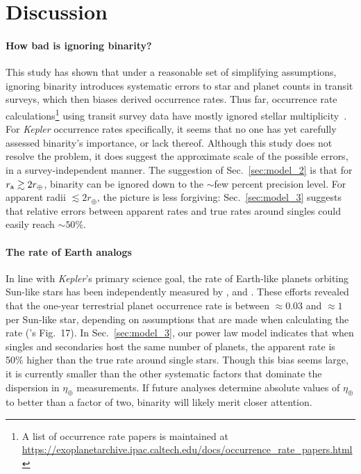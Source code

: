 \documentclass[12pt,modern]{aastex61}
\renewcommand{\a}{_{\rm a}}
\begin{document}
\section{Discussion}
\label{sec:discussion}


\paragraph{How bad is ignoring binarity?}
This study has shown that under a reasonable set of simplifying assumptions, 
ignoring binarity introduces systematic errors to star and planet counts in 
transit surveys, which then biases derived occurrence rates.
Thus far, occurrence rate calculations\footnote{
    A list of occurrence rate papers is maintained at 
    \url{https://exoplanetarchive.ipac.caltech.edu/docs/occurrence_rate_papers.html}
} using transit survey data have mostly ignored stellar 
multiplicity~\citep[\textit{e.g.},][]{howard_planet_2012,fressin_false_2013,foreman-mackey_exoplanet_2014,dressing_occurrence_2015,burke_terrestrial_2015}.
For {\it Kepler} occurrence rates specifically, 
it seems that no one has yet carefully assessed binarity's importance, or lack 
thereof.
Although this study does not resolve the problem, it does suggest the 
approximate scale of the possible errors, in a survey-independent manner.
The suggestion of Sec.~\ref{sec:model_2} is that for $r\a \gtrsim 2r_\oplus$, 
binarity can be ignored down to the $\sim$few percent precision level.
For apparent radii $\lesssim 2r_\oplus$, the picture is less forgiving:
Sec.~\ref{sec:model_3} suggests that relative errors between apparent rates 
and true rates around singles could easily reach $\sim\! 50\%$.

\paragraph{The rate of Earth analogs}
In line with {\it Kepler}'s primary science goal, the rate of Earth-like 
planets orbiting Sun-like stars has been independently measured by 
\citet{youdin_exoplanet_2011,petigura_prevalence_2013,dong_fast_2013,
    foreman-mackey_exoplanet_2014}, and \citet{burke_terrestrial_2015}.
These efforts revealed that the one-year terrestrial planet occurrence rate 
is between $\approx\! 0.03$ and $\approx\!1$ per Sun-like star,
depending on assumptions that are made when calculating the rate 
(\citealt{burke_terrestrial_2015}'s Fig.~17).
In Sec.~\ref{sec:model_3}, our power law model indicates that when singles and 
secondaries host the same number of planets, the apparent rate is 50\% higher 
than the true rate around single stars.
Though this bias seems large, it is currently smaller than the other 
systematic factors that dominate the dispersion in $\eta_\oplus$ 
measurements.
If future analyses determine absolute values of $\eta_\oplus$ to 
better than a factor of two, binarity will likely merit closer attention.
\end{document}
